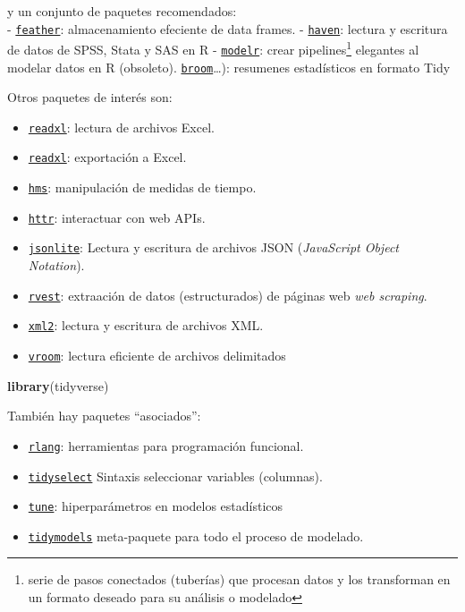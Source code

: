 \documentclass[
]{book}
\newenvironment{Shaded}{\begin{snugshade}}{\end{snugshade}}
\newcommand{\FunctionTok}[1]{\textcolor[rgb]{0.13,0.29,0.53}{\textbf{#1}}}
\newcommand{\NormalTok}[1]{#1}
\providecommand{\tightlist}{%
  \setlength{\itemsep}{0pt}\setlength{\parskip}{0pt}}
\begin{document}
y un conjunto de paquetes recomendados:\\
- \href{https://github.com/wesm/feather}{\texttt{feather}}: almacenamiento efeciente de data frames.
- \href{https://github.com/tidyverse/haven}{\texttt{haven}}: lectura y escritura de datos de SPSS, Stata y SAS en R
- \href{https://github.com/tidyverse/modelr}{\texttt{modelr}}: crear pipelines\footnote{serie de pasos conectados (tuberías) que procesan datos y los transforman en un formato deseado para su análisis o modelado} elegantes al modelar datos en R (obsoleto). \href{https://github.com/tidymodels/broom}{\texttt{broom}}\ldots): resumenes estadísticos en formato Tidy

Otros paquetes de interés son:

\begin{itemize}
\tightlist
\item
  \href{https://github.com/tidyverse/readxl}{\texttt{readxl}}: lectura de archivos Excel.
\item
  \href{https://github.com/ropensci/writexl}{\texttt{readxl}}: exportación a Excel.
\item
  \href{https://github.com/tidyverse/hms}{\texttt{hms}}: manipulación de medidas de tiempo.
\item
  \href{https://github.com/r-lib/httr}{\texttt{httr}}: interactuar con web APIs.
\item
  \href{https://github.com/jeroen/jsonlite}{\texttt{jsonlite}}: Lectura y escritura de archivos JSON (\emph{JavaScript Object Notation}).
\item
  \href{https://github.com/tidyverse/rvest}{\texttt{rvest}}: extraación de datos (estructurados) de páginas web \emph{web scraping}.
\item
  \href{https://github.com/r-lib/xml2}{\texttt{xml2}}: lectura y escritura de archivos XML.
\item
  \href{https://github.com/tidyverse/vroom}{\texttt{vroom}}: lectura eficiente de archivos delimitados
\end{itemize}

\begin{Shaded}
\begin{Highlighting}[]
\FunctionTok{library}\NormalTok{(tidyverse)}
\end{Highlighting}
\end{Shaded}

También hay paquetes ``asociados'':

\begin{itemize}
\tightlist
\item
  \href{https://rlang.r-lib.org}{\texttt{rlang}}: herramientas para programación funcional.
\item
  \href{https://tidyselect.r-lib.org}{\texttt{tidyselect}} Sintaxis seleccionar variables (columnas).
\item
  \href{https://tune.tidymodels.org/}{\texttt{tune}}: hiperparámetros en modelos estadísticos
\item
  \href{https://tidymodels.tidymodels.org}{\texttt{tidymodels}} meta-paquete para todo el proceso de modelado.
\end{itemize}
\end{document}

